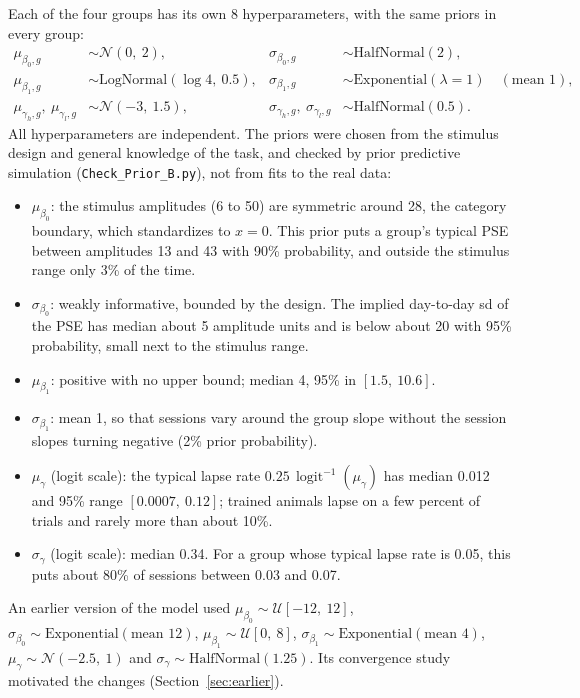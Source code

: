 \documentclass[11pt]{article}
\newcommand{\invlogit}{\operatorname{logit}^{-1}}
\newcommand{\code}[1]{\texttt{#1}}
\begin{document}
Each of the four groups has its own 8 hyperparameters, with the same priors in
every group:
\begin{align*}
  \mu_{\beta_0,g} &\sim \mathcal{N}(0,\ 2), &
  \sigma_{\beta_0,g} &\sim \text{HalfNormal}(2), \\
  \mu_{\beta_1,g} &\sim \text{LogNormal}(\log 4,\ 0.5), &
  \sigma_{\beta_1,g} &\sim \text{Exponential}(\lambda = 1) \quad (\text{mean } 1), \\
  \mu_{\gamma_h,g},\ \mu_{\gamma_l,g} &\sim \mathcal{N}(-3,\ 1.5), &
  \sigma_{\gamma_h,g},\ \sigma_{\gamma_l,g} &\sim \text{HalfNormal}(0.5).
\end{align*}
All hyperparameters are independent. The priors were chosen from the stimulus
design and general knowledge of the task, and checked by prior predictive
simulation (\code{Check\_Prior\_B.py}), not from fits to the real data:
\begin{itemize}
  \item $\mu_{\beta_0}$: the stimulus amplitudes (6 to 50) are symmetric around 28,
        the category boundary, which standardizes to $x = 0$. This prior puts a
        group's typical PSE between amplitudes 13 and 43 with 90\% probability,
        and outside the stimulus range only 3\% of the time.
  \item $\sigma_{\beta_0}$: weakly informative, bounded by the design. The implied
        day-to-day sd of the PSE has median about 5 amplitude units and is below
        about 20 with 95\% probability, small next to the stimulus range.
  \item $\mu_{\beta_1}$: positive with no upper bound; median 4, 95\% in
        $[1.5,\ 10.6]$.
  \item $\sigma_{\beta_1}$: mean 1, so that sessions vary around the group slope
        without the session slopes turning negative (2\% prior probability).
  \item $\mu_\gamma$ (logit scale): the typical lapse rate
        $0.25\,\invlogit(\mu_\gamma)$ has median 0.012 and 95\% range
        $[0.0007,\ 0.12]$; trained animals lapse on a few percent of trials and
        rarely more than about 10\%.
  \item $\sigma_\gamma$ (logit scale): median 0.34. For a group whose typical
        lapse rate is 0.05, this puts about 80\% of sessions between 0.03 and 0.07.
\end{itemize}

An earlier version of the model used
$\mu_{\beta_0} \sim \mathcal{U}[-12,\ 12]$,
$\sigma_{\beta_0} \sim \text{Exponential}(\text{mean } 12)$,
$\mu_{\beta_1} \sim \mathcal{U}[0,\ 8]$,
$\sigma_{\beta_1} \sim \text{Exponential}(\text{mean } 4)$,
$\mu_\gamma \sim \mathcal{N}(-2.5,\ 1)$ and
$\sigma_\gamma \sim \text{HalfNormal}(1.25)$.
Its convergence study motivated the changes (Section~\ref{sec:earlier}).
\end{document}
